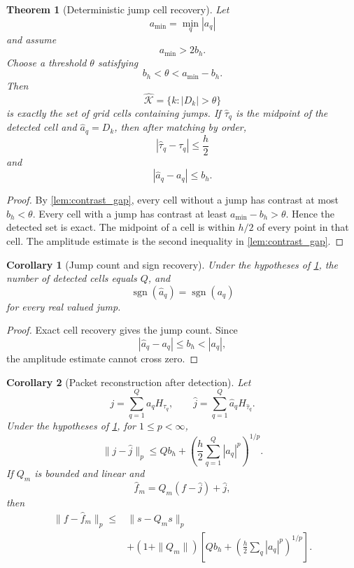 \documentclass[11pt,letterpaper]{article}
\newtheorem{theorem}{Theorem}[section]
\theoremstyle{plain}
\theoremstyle{plain}
\theoremstyle{plain}
\newtheorem{corollary}[corollary]{Corollary}
\theoremstyle{definition}
\theoremstyle{definition}
\theoremstyle{definition}
\theoremstyle{definition}
\theoremstyle{remark}
\theoremstyle{remark}
\theoremstyle{remark}
\theoremstyle{remark}
\newcommand{\Kcal}{\mathcal K}
\newcommand{\sgn}{\operatorname{sgn}}
\let\KomorebiPrimitiveWidehat\widehat
\renewcommand{\widehat}[1]{\KomorebiPrimitiveWidehat{#1}}
\begin{document}
\begin{theorem}[Deterministic jump cell recovery]\label{thm:deterministic_jump_recovery}
Let
\[
a_{\min}=\min_q|a_q|
\]
and assume
\[
a_{\min}>2b_h.
\]
Choose a threshold \(\theta\) satisfying
\[
b_h<\theta<a_{\min}-b_h.
\]
Then
\[
\widehat\Kcal
=
\{k:|D_k|>\theta\}
\]
is exactly the set of grid cells containing jumps. If \(\widehat\tau_q\) is the midpoint of the detected cell and \(\widehat a_q=D_k\), then after matching by order,
\[
|\widehat\tau_q-\tau_q|
\leq
\frac h2
\]
and
\[
|\widehat a_q-a_q|
\leq
b_h.
\]
\end{theorem}

\begin{proof}
By \cref{lem:contrast_gap}, every cell without a jump has contrast at most \(b_h<\theta\). Every cell with a jump has contrast at least \(a_{\min}-b_h>\theta\). Hence the detected set is exact. The midpoint of a cell is within \(h/2\) of every point in that cell. The amplitude estimate is the second inequality in \cref{lem:contrast_gap}.
\end{proof}

\begin{corollary}[Jump count and sign recovery]\label{cor:jump_count_sign}
Under the hypotheses of \cref{thm:deterministic_jump_recovery}, the number of detected cells equals \(Q\), and
\[
\sgn(\widehat a_q)=\sgn(a_q)
\]
for every real valued jump.
\end{corollary}

\begin{proof}
Exact cell recovery gives the jump count. Since
\[
|\widehat a_q-a_q|\leq b_h<|a_q|,
\]
the amplitude estimate cannot cross zero.
\end{proof}

\begin{corollary}[Packet reconstruction after detection]\label{cor:reconstruction_after_detection}
Let
\[
j=\sum_{q=1}^{Q}a_qH_{\tau_q},
\qquad
\widehat j=\sum_{q=1}^{Q}\widehat a_qH_{\widehat\tau_q}.
\]
Under the hypotheses of \cref{thm:deterministic_jump_recovery}, for \(1\leq p<\infty\),
\[
\|j-\widehat j\|_p
\leq
Qb_h
+
\left(
\frac h2\sum_{q=1}^{Q}|a_q|^p
\right)^{1/p}.
\]
If \(Q_m\) is bounded and linear and
\[
\widehat f_m=Q_m(f-\widehat j)+\widehat j,
\]
then
\[
\begin{aligned}
\|f-\widehat f_m\|_p
\leq{}&
\|s-Q_ms\|_p\\
&+(1+\|Q_m\|)
\left[
Qb_h+
\left(
\frac h2\sum_q|a_q|^p
\right)^{1/p}
\right].
\end{aligned}
\]
\end{corollary}
\end{document}
